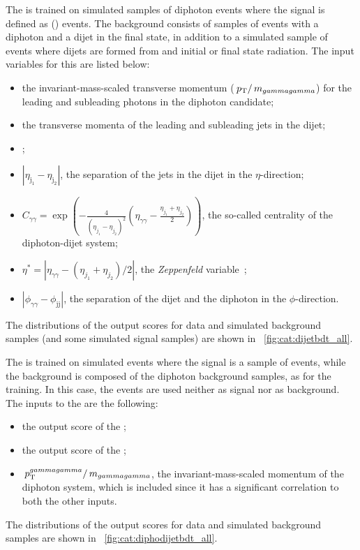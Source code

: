 The \DiJetBdt is trained on simulated samples of diphoton events where the signal is defined as \VBF (\Hgg) events. The background consists of samples of \SM events with a diphoton and a dijet in the final state, in addition to a simulated sample of \ggH events where dijets are formed from \PU and initial or final state radiation. The input variables for this \BDT are listed below:
\begin{itemize}
\item the invariant-mass-scaled transverse momentum ($\,p_\text{T}/\,m_{gammagamma}$) for the leading and subleading photons in the diphoton candidate;
\item the transverse momenta of the leading and subleading jets in the dijet;
\item \mjj;
\item $|\eta_{\text{j}_1} - \eta_{\text{j}_2}|$, the separation of the jets in the dijet in the $\eta$-direction;
\ifNewAnalysis
\item $C_{\gamma\gamma} = \exp(-\frac{4}{(\eta_{j_1}-\eta_{j_2})^2}(\eta_{\gamma\gamma}-\frac{\eta_{j_1}+\eta_{j_2}}{2}))$, the so-called centrality of the diphoton-dijet system;
\else
\item $\eta^{*} = |\eta_{\gamma\gamma} - (\eta_{j_1}+\eta_{j_2})/2|$, the \emph{Zeppenfeld} variable~\cite{Zeppenfeld};
\fi
\item $|\phi_{\gamma\gamma} - \phi_\text{jj}|$, the separation of the dijet and the diphoton in the $\phi$-direction.
\end{itemize}
The distributions of the \DiJetBdt output scores for data and simulated background samples (and some simulated signal samples) are shown in \Fig~\ref{fig:cat:dijetbdt_all}. 


The \DiPhoDiJetBdt is trained on simulated events where the signal is a sample of \VBF \Hgg events, while the background is composed of the \SM diphoton background samples, as for the \DiJetBdt training. In this case, the \ggH events are used neither as signal nor as background. The inputs to the \BDT are the following:
\begin{itemize}
\item the output score of the \DiPhoBdt;
\item the output score of the \DiJetBdt;
\item $\,p_\text{T}^{gammagamma}/\,m_{gammagamma}$, the invariant-mass-scaled momentum of the diphoton system, which is included since it has a significant correlation to both the other inputs.
\end{itemize}
The distributions of the \DiJetBdt output scores for data and simulated background samples are shown in \Fig~\ref{fig:cat:diphodijetbdt_all}. 

